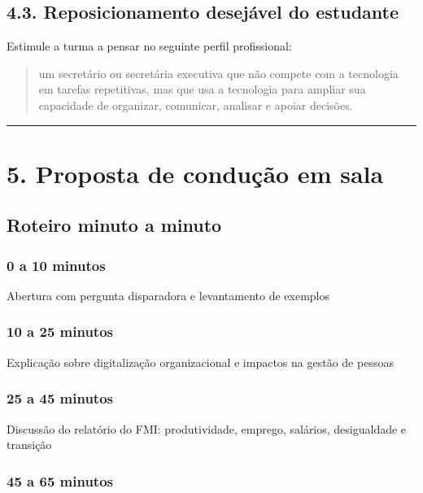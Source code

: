 \documentclass[
]{book}
\theoremstyle{definition}
\theoremstyle{definition}
\theoremstyle{definition}
\theoremstyle{definition}
\theoremstyle{remark}
\begin{document}
\section{4.3. Reposicionamento desejável do estudante}\label{reposicionamento-desejuxe1vel-do-estudante}

Estimule a turma a pensar no seguinte perfil profissional:

\begin{quote}
um secretário ou secretária executiva que não compete com a tecnologia em tarefas repetitivas, mas que usa a tecnologia para ampliar sua capacidade de organizar, comunicar, analisar e apoiar decisões.
\end{quote}

\begin{center}\rule{0.5\linewidth}{0.5pt}\end{center}

\chapter{5. Proposta de condução em sala}\label{proposta-de-conduuxe7uxe3o-em-sala}

\section{Roteiro minuto a minuto}\label{roteiro-minuto-a-minuto}

\subsection{0 a 10 minutos}\label{a-10-minutos}

Abertura com pergunta disparadora e levantamento de exemplos

\subsection{10 a 25 minutos}\label{a-25-minutos}

Explicação sobre digitalização organizacional e impactos na gestão de pessoas

\subsection{25 a 45 minutos}\label{a-45-minutos}

Discussão do relatório do FMI: produtividade, emprego, salários, desigualdade e transição

\subsection{45 a 65 minutos}\label{a-65-minutos}
\end{document}
